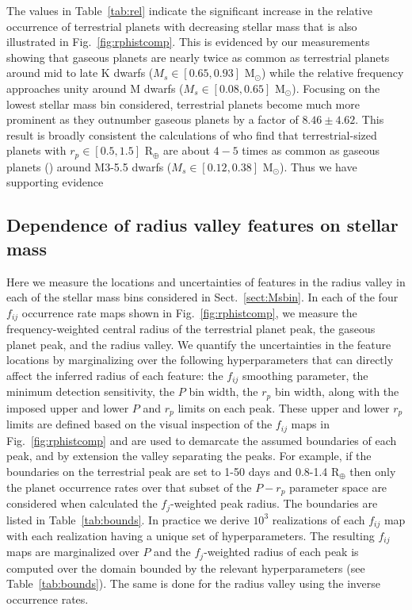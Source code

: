 \documentclass[twocolumn]{emulateapj}
\begin{document}


The values in Table~\ref{tab:rel} indicate the significant increase in the relative occurrence of terrestrial
planets with decreasing stellar mass that is also illustrated in Fig.~\ref{fig:rphistcomp}. This is evidenced by
our measurements showing that gaseous planets are nearly twice as common as terrestrial planets
around mid to late K dwarfs ($M_s \in [0.65,0.93]$ M$_{\odot}$) while the relative frequency approaches unity
around M dwarfs ($M_s \in [0.08,0.65]$ M$_{\odot}$). Focusing on the lowest stellar mass bin considered,
terrestrial planets become much more prominent as they outnumber gaseous planets by a factor of
$8.46\pm 4.62$. This result is broadly
consistent the calculations of \cite{hardegree19} who find that terrestrial-sized 
planets with $r_p \in[0.5,1.5]$ R$_{\oplus}$ are about $4-5$ times as common as gaseous planets ()
around M3-5.5 dwarfs ($M_s \in [0.12,0.38]$ M$_{\odot}$). Thus we have supporting evidence 

\subsection{Dependence of radius valley features on stellar mass}
Here we measure the locations and uncertainties of features in the radius valley in each of the stellar
mass bins considered in Sect.~\ref{sect:Msbin}. In each of the four $f_{ij}$ occurrence rate maps shown
in Fig.~\ref{fig:rphistcomp}, we measure the frequency-weighted central radius of the terrestrial planet peak,
the gaseous planet peak, and the radius valley. We quantify the uncertainties in the feature locations by
marginalizing over the following hyperparameters that can directly affect the inferred radius of each feature:
the $f_{ij}$ smoothing parameter, the minimum detection sensitivity,
the $P$ bin width, the $r_p$ bin width, along with the imposed upper and
lower $P$ and $r_p$ limits on each peak. These upper and lower $r_p$ limits are defined based on the visual
inspection of the $f_{ij}$ maps in Fig.~\ref{fig:rphistcomp} and are used to demarcate the assumed
boundaries of each peak, and by extension the valley separating the peaks.
For example, if the boundaries on the terrestrial peak are set to 1-50 days and 0.8-1.4 R$_{\oplus}$ then only
the planet occurrence rates over that subset of the $P-r_p$ parameter space are considered when calculated the
$f_j$-weighted peak radius. The boundaries are listed in Table~\ref{tab:bounds}.
In practice we derive $10^3$ realizations of each $f_{ij}$ map with each realization having a unique set of
hyperparameters. The resulting $f_{ij}$ maps are marginalized over $P$ and the $f_j$-weighted radius of
each peak is computed over the domain bounded by the relevant hyperparameters (see Table~\ref{tab:bounds}).
The same is done for the radius valley using the inverse occurrence rates.
\end{document}
